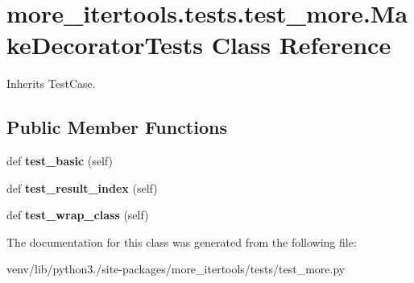 \hypertarget{classmore__itertools_1_1tests_1_1test__more_1_1_make_decorator_tests}{}\section{more\+\_\+itertools.\+tests.\+test\+\_\+more.\+Make\+Decorator\+Tests Class Reference}
\label{classmore__itertools_1_1tests_1_1test__more_1_1_make_decorator_tests}


Inherits Test\+Case.

\subsection*{Public Member Functions}
\begin{DoxyCompactItemize}
\item 
\mbox{\label{classmore__itertools_1_1tests_1_1test__more_1_1_make_decorator_tests_ac1ca13adbd9201f4de64689e452bb851}} 
def {\bfseries test\+\_\+basic} (self)
\item 
\mbox{\label{classmore__itertools_1_1tests_1_1test__more_1_1_make_decorator_tests_a2857b102f5cce012d3bf98eadd467cb6}} 
def {\bfseries test\+\_\+result\+\_\+index} (self)
\item 
\mbox{\label{classmore__itertools_1_1tests_1_1test__more_1_1_make_decorator_tests_ab689284e02445572ffedfc078bb9853c}} 
def {\bfseries test\+\_\+wrap\+\_\+class} (self)
\end{DoxyCompactItemize}


The documentation for this class was generated from the following file\+:\begin{DoxyCompactItemize}
\item 
venv/lib/python3./site-\/packages/more\+\_\+itertools/tests/test\+\_\+more.\+py\end{DoxyCompactItemize}
